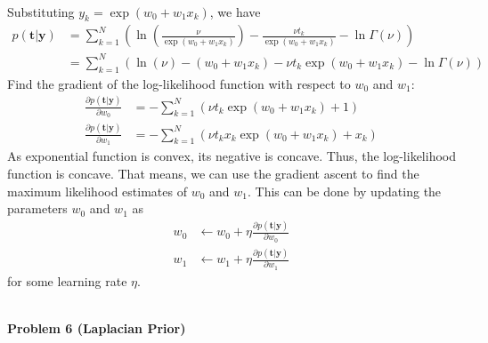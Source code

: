 \documentclass{article}
\begin{document}
\begin{enumerate}
\begin{sol}
\begin{align*}
        \end{align*}
        Substituting $y_k = \exp\left(w_0 + w_1 x_k\right)$, we have
        \begin{align*}
            p(\mathbf{t}|\mathbf{y}) &= \sum_{k=1}^{N} \left(\ln\left(\frac{\nu}{\exp\left(w_0 + w_1 x_k\right)}\right) - \frac{\nu t_k}{\exp\left(w_0 + w_1 x_k\right)} - \ln \Gamma(\nu)\right)\\
            &= \sum_{k=1}^N \left(\ln(\nu) - (w_0+w_1 x_k) - \nu t_k \exp(w_0 + w_1x_k) - \ln \Gamma(\nu)\right)
        \end{align*}
        Find the gradient of the log-likelihood function with respect to $w_0$ and $w_1$:
        \begin{align*}
            \frac{\partial p(\mathbf{t}|\mathbf{y})}{\partial w_0} &= -\sum_{k=1}^{N} \left(\nu t_k\exp(w_0 + w_1 x_k) + 1  \right)\\
            \frac{\partial p(\mathbf{t}|\mathbf{y})}{\partial w_1} &= -\sum_{k=1}^{N} \left(\nu t_k x_k \exp(w_0 + w_1 x_k) + x_k\right)
        \end{align*}
        As exponential function is convex, its negative is concave. Thus, the log-likelihood function is concave. That means, we can use the gradient ascent to find the maximum likelihood estimates of $w_0$ and $w_1$.
        This can be done by updating the parameters $w_0$ and $w_1$ as
        \begin{align*}
            w_0 &\leftarrow w_0 + \eta \frac{\partial p(\mathbf{t}|\mathbf{y})}{\partial w_0}\\
            w_1 &\leftarrow w_1 + \eta \frac{\partial p(\mathbf{t}|\mathbf{y})}{\partial w_1}
        \end{align*}
        for some learning rate $\eta$.
    \end{sol}
    \color{black}
\end{enumerate}
\leavevmode\\
\noindent
\Large{\textbf{Problem 6 (Laplacian Prior)}}\normalsize
\\
\end{document}
